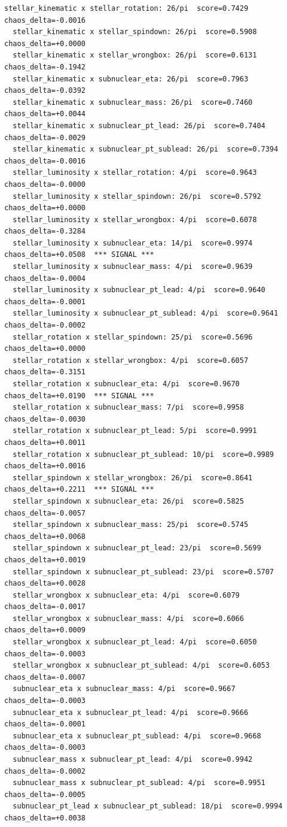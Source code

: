 \documentclass[11pt, letterpaper, openany]{book}
\begin{document}
\begin{empiricalbox}
\begin{lstlisting}[style=terminal]
  stellar_kinematic x stellar_rotation: 26/pi  score=0.7429  chaos_delta=-0.0016
  stellar_kinematic x stellar_spindown: 26/pi  score=0.5908  chaos_delta=+0.0000
  stellar_kinematic x stellar_wrongbox: 26/pi  score=0.6131  chaos_delta=-0.1942
  stellar_kinematic x subnuclear_eta: 26/pi  score=0.7963  chaos_delta=-0.0392
  stellar_kinematic x subnuclear_mass: 26/pi  score=0.7460  chaos_delta=+0.0044
  stellar_kinematic x subnuclear_pt_lead: 26/pi  score=0.7404  chaos_delta=-0.0029
  stellar_kinematic x subnuclear_pt_sublead: 26/pi  score=0.7394  chaos_delta=-0.0016
  stellar_luminosity x stellar_rotation: 4/pi  score=0.9643  chaos_delta=-0.0000
  stellar_luminosity x stellar_spindown: 26/pi  score=0.5792  chaos_delta=+0.0000
  stellar_luminosity x stellar_wrongbox: 4/pi  score=0.6078  chaos_delta=-0.3284
  stellar_luminosity x subnuclear_eta: 14/pi  score=0.9974  chaos_delta=+0.0508  *** SIGNAL ***
  stellar_luminosity x subnuclear_mass: 4/pi  score=0.9639  chaos_delta=-0.0004
  stellar_luminosity x subnuclear_pt_lead: 4/pi  score=0.9640  chaos_delta=-0.0001
  stellar_luminosity x subnuclear_pt_sublead: 4/pi  score=0.9641  chaos_delta=-0.0002
  stellar_rotation x stellar_spindown: 25/pi  score=0.5696  chaos_delta=+0.0000
  stellar_rotation x stellar_wrongbox: 4/pi  score=0.6057  chaos_delta=-0.3151
  stellar_rotation x subnuclear_eta: 4/pi  score=0.9670  chaos_delta=+0.0190  *** SIGNAL ***
  stellar_rotation x subnuclear_mass: 7/pi  score=0.9958  chaos_delta=-0.0030
  stellar_rotation x subnuclear_pt_lead: 5/pi  score=0.9991  chaos_delta=+0.0011
  stellar_rotation x subnuclear_pt_sublead: 10/pi  score=0.9989  chaos_delta=+0.0016
  stellar_spindown x stellar_wrongbox: 26/pi  score=0.8641  chaos_delta=+0.2211  *** SIGNAL ***
  stellar_spindown x subnuclear_eta: 26/pi  score=0.5825  chaos_delta=-0.0057
  stellar_spindown x subnuclear_mass: 25/pi  score=0.5745  chaos_delta=+0.0068
  stellar_spindown x subnuclear_pt_lead: 23/pi  score=0.5699  chaos_delta=+0.0019
  stellar_spindown x subnuclear_pt_sublead: 23/pi  score=0.5707  chaos_delta=+0.0028
  stellar_wrongbox x subnuclear_eta: 4/pi  score=0.6079  chaos_delta=-0.0017
  stellar_wrongbox x subnuclear_mass: 4/pi  score=0.6066  chaos_delta=+0.0009
  stellar_wrongbox x subnuclear_pt_lead: 4/pi  score=0.6050  chaos_delta=-0.0003
  stellar_wrongbox x subnuclear_pt_sublead: 4/pi  score=0.6053  chaos_delta=-0.0007
  subnuclear_eta x subnuclear_mass: 4/pi  score=0.9667  chaos_delta=-0.0003
  subnuclear_eta x subnuclear_pt_lead: 4/pi  score=0.9666  chaos_delta=-0.0001
  subnuclear_eta x subnuclear_pt_sublead: 4/pi  score=0.9668  chaos_delta=-0.0003
  subnuclear_mass x subnuclear_pt_lead: 4/pi  score=0.9942  chaos_delta=-0.0002
  subnuclear_mass x subnuclear_pt_sublead: 4/pi  score=0.9951  chaos_delta=-0.0005
  subnuclear_pt_lead x subnuclear_pt_sublead: 18/pi  score=0.9994  chaos_delta=+0.0038


\end{lstlisting}
\end{empiricalbox}
\end{document}
